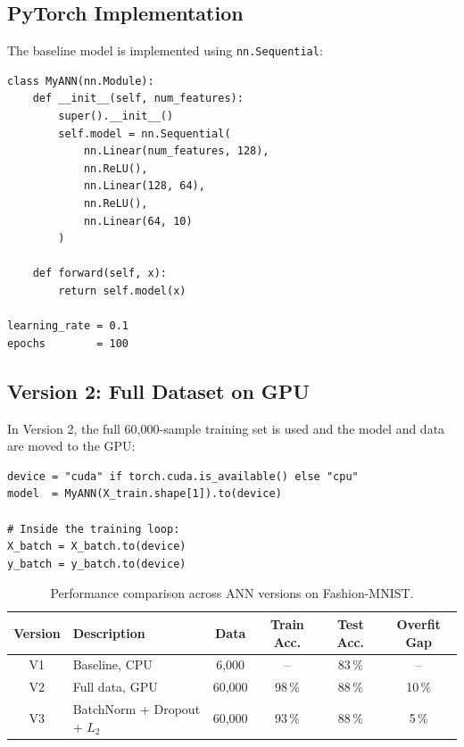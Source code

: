 \documentclass[12pt,a4paper]{article}
\newcommand{\Ltwo}{L_2}
\begin{document}
\subsection{PyTorch Implementation}
\label{sec:ann_arch:impl}

The baseline model is implemented using \texttt{nn.Sequential}:

\begin{example}[title=Baseline ANN (Version 1 -- CPU, 6{,}000 samples)]
\begin{verbatim}
class MyANN(nn.Module):
    def __init__(self, num_features):
        super().__init__()
        self.model = nn.Sequential(
            nn.Linear(num_features, 128),
            nn.ReLU(),
            nn.Linear(128, 64),
            nn.ReLU(),
            nn.Linear(64, 10)
        )

    def forward(self, x):
        return self.model(x)

learning_rate = 0.1
epochs        = 100
\end{verbatim}
\end{example}

\subsection{Version 2: Full Dataset on GPU}
\label{sec:ann_arch:gpu}

In Version 2, the full 60{,}000-sample training set is used and the model
and data are moved to the GPU:

\begin{verbatim}
device = "cuda" if torch.cuda.is_available() else "cpu"
model  = MyANN(X_train.shape[1]).to(device)

# Inside the training loop:
X_batch = X_batch.to(device)
y_batch = y_batch.to(device)
\end{verbatim}

\begin{table}[htbp]
  \centering
  \caption{Performance comparison across ANN versions on Fashion-MNIST.}
  \label{tab:ann_versions}
  \begin{tabular}{clcccc}
    \toprule
    \textbf{Version} & \textbf{Description}
      & \textbf{Data} & \textbf{Train Acc.}
      & \textbf{Test Acc.} & \textbf{Overfit Gap} \\
    \midrule
    V1 & Baseline, CPU          & 6{,}000  & --    & 83\,\% & -- \\
    V2 & Full data, GPU         & 60{,}000 & 98\,\% & 88\,\% & 10\,\% \\
    V3 & BatchNorm + Dropout + $\Ltwo$ & 60{,}000 & 93\,\% & 88\,\% & 5\,\% \\
    \bottomrule
  \end{tabular}
\end{table}
\end{document}
